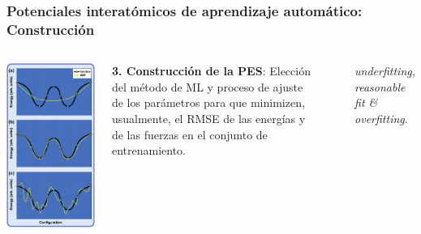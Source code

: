 \documentclass[aspectratio=169]{beamer}
\let\oldtextbf\textbf
\renewcommand{\textbf}[1]{\textcolor{nordblue}{\oldtextbf{#1}}}
\begin{document}
    \begin{frame}
        \frametitle{Potenciales interatómicos de aprendizaje automático: Construcción}

        \begin{columns}
            \begin{center}
                \includegraphics[width=0.65\columnwidth]{intro-fitting.png}
            \end{center}

            \textbf{3. Construcción de la PES}: Elección del método de ML y 
            proceso de ajuste de los parámetros para que minimizen, usualmente, 
            el RMSE de las energías y de las fuerzas en el conjunto de 
            entrenamiento.

            \

            \textit{underfitting, reasonable fit \& overfitting}.
        \end{columns}

	\end{frame}
    
\end{document}
